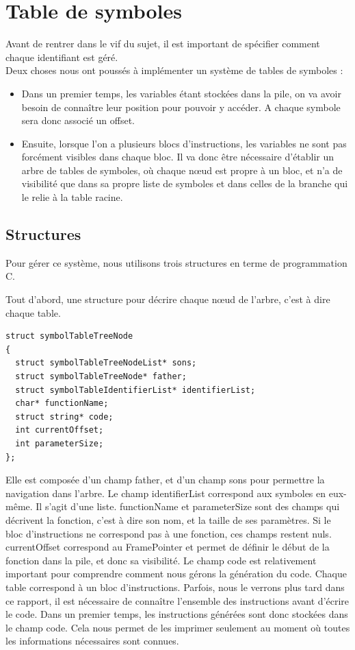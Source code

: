 \section{Table de symboles}

Avant de rentrer dans le vif du sujet, il est important de spécifier comment chaque identifiant est géré.\\ Deux choses nous ont poussés à implémenter un système de tables de symboles :
\begin{itemize}
\item Dans un premier temps, les variables étant stockées dans la pile, on va avoir besoin de connaître leur position pour pouvoir y accéder. A chaque symbole sera donc associé un offset.
\item Ensuite, lorsque l'on a plusieurs blocs d'instructions, les variables ne sont pas forcément visibles dans chaque bloc. Il va donc être nécessaire d'établir un arbre de tables de symboles, où chaque n\oe{}ud est propre à un bloc, et n'a de visibilité que dans sa propre liste de symboles et dans celles de la branche qui le relie à la table racine.
\end{itemize}


\subsection*{Structures}

Pour gérer ce système, nous utilisons trois structures en terme de programmation C.

Tout d'abord, une structure pour décrire chaque n\oe{}ud de l'arbre, c'est à dire chaque table. 

\begin{verbatim}
struct symbolTableTreeNode
{
  struct symbolTableTreeNodeList* sons;
  struct symbolTableTreeNode* father;
  struct symbolTableIdentifierList* identifierList;
  char* functionName;
  struct string* code;
  int currentOffset;
  int parameterSize;
};
\end{verbatim} 

Elle est composée d'un champ father, et d'un champ sons pour permettre la navigation dans l'arbre. 
Le champ identifierList correspond aux symboles en eux-même. Il s'agit d'une liste. 
functionName et parameterSize sont des champs qui décrivent la fonction, c'est à dire son nom, et la taille de ses paramètres. Si le bloc d'instructions ne correspond pas à une fonction, ces champs restent nuls.
currentOffset correspond au FramePointer et permet de définir le début de la fonction dans la pile, et donc sa visibilité.
Le champ code est relativement important pour comprendre comment nous gérons la génération du code. Chaque table correspond à un bloc d'instructions. Parfois, nous le verrons plus tard dans ce rapport, il est nécessaire de connaître l'ensemble des instructions avant d'écrire le code. Dans un premier temps, les instructions générées sont donc stockées dans le champ code. Cela nous permet de les imprimer seulement au moment où toutes les informations nécessaires sont connues.


